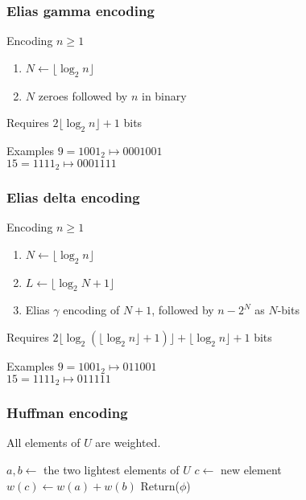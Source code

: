 \documentclass[14pt]{beamer}
\begin{document}
\begin{frame}\frametitle{Elias gamma encoding}
\begin{block}{Encoding $n\ge 1$}
\begin{enumerate} 
\item
$N\gets \lfloor \log_{2} n \rfloor$
\item
$N$ zeroes followed by $n$ in binary
\end{enumerate}
Requires $2\lfloor \log_{2} n \rfloor +1$ bits
\end{block}

\begin{block}{Examples}
$9 = 1001_{2} \mapsto 000 1001$\\
$15 = 1111_{2} \mapsto 000 1111$\\
\end{block}
\end{frame}

\begin{frame}\frametitle{Elias delta encoding}
\begin{block}{Encoding $n\ge 1$}
\begin{enumerate} 
\item
$N\gets \lfloor \log_{2} n \rfloor$
\item
$L\gets \lfloor \log_{2} N+1 \rfloor$
\item
Elias $\gamma$ encoding of $N+1$, followed by $n-2^{N}$ as $N$-bits
\end{enumerate}
Requires $2\lfloor \log_{2} \left( \lfloor \log_{2} n \rfloor + 1 \right)\rfloor
 +\lfloor \log_{2} n \rfloor + 1$ bits
\end{block}

\begin{block}{Examples}
$9 = 1001_{2} \mapsto 01 1 001$\\
$15 = 1111_{2} \mapsto 01 1 111$\\
\end{block}
\end{frame}

\begin{frame}\frametitle{Huffman encoding}
All elements of $U$ are weighted.    
\begin{algorithm}[H]
$a,b\gets$ the two lightest elements of $U$\;
$c\gets$ new element
$w(c) \gets w(a) + w(b)$\;
Return($\phi$)\;
\caption{Huffman encoding}
\end{algorithm}

\end{frame}
\end{document}
